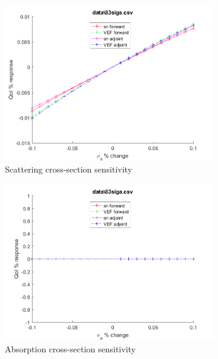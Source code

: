 \documentclass{article}
\begin{document}
\begin{figure}[H]
\begin{subfigure}{.5\textwidth}
  \includegraphics[width=.98\linewidth]{IanProposal/figures2/83sigsSens.png}
  \caption{Scattering cross-section sensitivity}
  \label{fig:sfig2}
\end{subfigure}%
\begin{subfigure}{.5\textwidth}
  \centering
  \includegraphics[width=.98\linewidth]{IanProposal/figures2/83sigaSens.png}
  \caption{Absorption cross-section sensitivity}
  \label{fig:sfig5}
\end{subfigure}%
\caption{}
\label{fig:fig}
\end{figure}
\newpage
\end{document}
